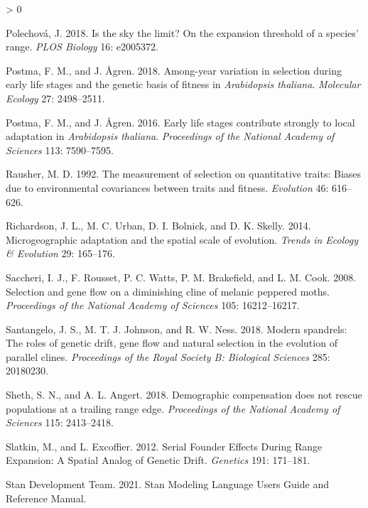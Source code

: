 \documentclass[
  12pt,
]{article}
\newlength{\cslhangindent}
\newenvironment{CSLReferences}[2] %
 {%
  \setlength{\parindent}{0pt}
  \ifodd #1 \everypar{\setlength{\hangindent}{\cslhangindent}}\ignorespaces\fi
  \ifnum #2 > 0
  \setlength{\parskip}{#2\baselineskip}
  \fi
 }%
 {}
\begin{document}
\begin{CSLReferences}{1}{0}
\leavevmode\hypertarget{ref-polechova_is_2018}{}%
Polechová, J. 2018. Is the sky the limit? {On} the expansion threshold of a species' range. \emph{PLOS Biology} 16: e2005372.

\leavevmode\hypertarget{ref-postma_among-year_2018}{}%
Postma, F. M., and J. Ågren. 2018. Among-year variation in selection during early life stages and the genetic basis of fitness in \emph{{Arabidopsis} thaliana}. \emph{Molecular Ecology} 27: 2498--2511.

\leavevmode\hypertarget{ref-postma_early_2016}{}%
Postma, F. M., and J. Ågren. 2016. Early life stages contribute strongly to local adaptation in \emph{{Arabidopsis} thaliana}. \emph{Proceedings of the National Academy of Sciences} 113: 7590--7595.

\leavevmode\hypertarget{ref-rausher_measurement_1992}{}%
Rausher, M. D. 1992. The measurement of selection on quantitative traits: Biases due to environmental covariances between traits and fitness. \emph{Evolution} 46: 616--626.

\leavevmode\hypertarget{ref-richardson_microgeographic_2014}{}%
Richardson, J. L., M. C. Urban, D. I. Bolnick, and D. K. Skelly. 2014. Microgeographic adaptation and the spatial scale of evolution. \emph{Trends in Ecology \& Evolution} 29: 165--176.

\leavevmode\hypertarget{ref-saccheri_selection_2008}{}%
Saccheri, I. J., F. Rousset, P. C. Watts, P. M. Brakefield, and L. M. Cook. 2008. Selection and gene flow on a diminishing cline of melanic peppered moths. \emph{Proceedings of the National Academy of Sciences} 105: 16212--16217.

\leavevmode\hypertarget{ref-santangelo_modern_2018}{}%
Santangelo, J. S., M. T. J. Johnson, and R. W. Ness. 2018. Modern spandrels: The roles of genetic drift, gene flow and natural selection in the evolution of parallel clines. \emph{Proceedings of the Royal Society B: Biological Sciences} 285: 20180230.

\leavevmode\hypertarget{ref-sheth_demographic_2018}{}%
Sheth, S. N., and A. L. Angert. 2018. Demographic compensation does not rescue populations at a trailing range edge. \emph{Proceedings of the National Academy of Sciences} 115: 2413--2418.

\leavevmode\hypertarget{ref-slatkin_serial_2012}{}%
Slatkin, M., and L. Excoffier. 2012. Serial {Founder} {Effects} {During} {Range} {Expansion}: {A} {Spatial} {Analog} of {Genetic} {Drift}. \emph{Genetics} 191: 171--181.

\leavevmode\hypertarget{ref-stan_development_team_stan_2021}{}%
Stan Development Team. 2021. Stan {Modeling} {Language} {Users} {Guide} and {Reference} {Manual}.


\end{CSLReferences}
\end{document}
